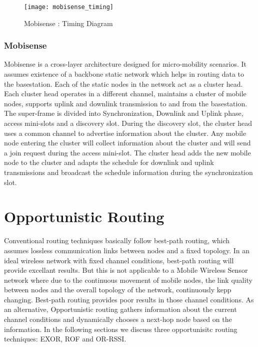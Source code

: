 \begin{figure}[h]{} 
  \begin{center}
		\texttt{[image: mobisense\_timing]}
		\caption{Mobisense : Timing Diagram}
	\label{fig:mobisense-timing}
  \end{center}
\end{figure}


\subsubsection{Mobisense}
Mobisense \cite{mobisense} is a cross-layer architecture designed for micro-mobility scenarios. It assumes existence of a backbone static network which helps in routing data to the basestation. Each of the static nodes in the network act as a cluster head. Each cluster head operates in a different channel, maintains a cluster of mobile nodes, supports uplink and downlink transmission to and from the basestation. The super-frame is divided into Synchronization, Downlink and Uplink phase, access mini-slots and a discovery slot. During the discovery slot, the cluster head uses a common channel to  advertise information about the cluster. Any mobile node entering the cluster will collect information about the cluster and will send a join request during the access mini-slot. The cluster head adds the new mobile node to the cluster and adapts the schedule for downlink and uplink transmissions and broadcast the schedule information during the synchronization slot.  

\section{Opportunistic Routing}

Conventional routing techniques basically follow best-path routing, which assumes lossless communication links between nodes and a fixed topology. In an ideal wireless network with fixed channel conditions, best-path routing will provide excellant results. But this is not applicable to a Mobile Wireless Sensor network where due to the continuous movement of mobile nodes, the link quality between nodes and the overall topology of the network, continuously kepp changing. Best-path routing provides poor results in those channel conditions. As an alternative, Opportunistic routing gathers information about the current channel conditions and dynamically chooses a next-hop node based on the information. In the following sections we discuss three opportunisitc routing techniques: EXOR\cite{exor}, ROF\cite{rof} and OR-RSSI\cite{or-rssi}.  

